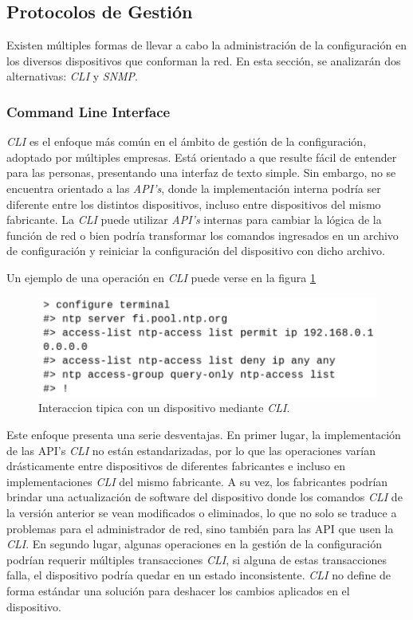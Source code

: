 \subsection{Protocolos de Gestión}
Existen múltiples formas de llevar a cabo la administración de la configuración en los diversos dispositivos que conforman la red. En esta sección, se analizarán dos alternativas: \textit{CLI} y \textit{SNMP}.

\subsubsection{Command Line Interface}
\textit{CLI} es el enfoque más común en el ámbito de gestión de la configuración, adoptado por múltiples empresas. Está orientado a que resulte fácil de entender para las personas, presentando una interfaz de texto simple. Sin embargo, no se encuentra orientado a las \textit{API’s}, donde la implementación interna podría ser diferente entre los distintos dispositivos, incluso entre dispositivos del mismo fabricante. La \textit{CLI} puede utilizar \textit{API’s} internas para cambiar la lógica de la función de red o bien podría transformar los comandos ingresados en un archivo de configuración y reiniciar la configuración del dispositivo con dicho archivo.

\newpage
Un ejemplo de una operación en \textit{CLI} puede verse en la figura \ref{fig:cli}
\\
\begin{figure}[htbp]
	\centering
	\includegraphics[scale=0.6]{Figures/cli.pdf}
	\caption{Interaccion tipica con un dispositivo mediante \textit{CLI}.}
	\label{fig:cli}
  \end{figure}

  Este enfoque presenta una serie desventajas. En primer lugar, la implementación de las API’s \textit{CLI} no están estandarizadas, por lo que las operaciones varían drásticamente entre dispositivos de diferentes fabricantes e incluso en implementaciones \textit{CLI} del mismo fabricante. A su vez, los fabricantes podrían brindar una actualización de software del dispositivo donde los comandos \textit{CLI} de la versión anterior se vean modificados o eliminados, lo que no solo se traduce a problemas para el administrador de red, sino también para las API que usen la \textit{CLI}. En segundo lugar, algunas operaciones en la gestión de la configuración podrían requerir múltiples transacciones \textit{CLI}, si alguna de estas transacciones falla, el dispositivo podría quedar en un estado inconsistente. \textit{CLI} no define de forma estándar una solución para deshacer los cambios aplicados en el dispositivo.

